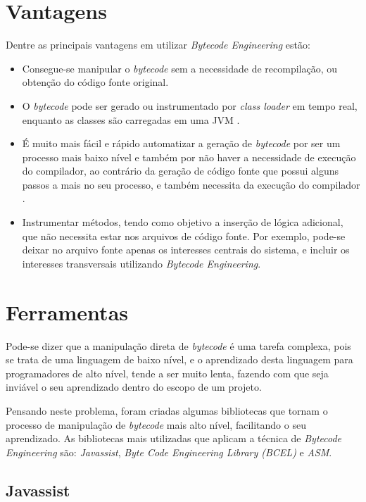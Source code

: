 \documentclass[tc,openright]{iiufrgs}
\begin{document}
\section {Vantagens}

Dentre as principais vantagens em utilizar \textit{Bytecode Engineering} estão:

\begin{itemize}
\item Consegue-se manipular o \textit{bytecode} sem a necessidade de recompilação, ou obtenção do código fonte original.
\item O \textit{bytecode} pode ser gerado ou instrumentado por \textit{class loader} em tempo real, enquanto as classes são carregadas em uma JVM \cite{kalinovsky2004covert}.
\item É muito mais fácil e rápido automatizar a geração de \textit{bytecode} por ser um processo mais baixo nível e também por não haver a necessidade de execução do compilador, ao contrário da geração de código fonte que possui alguns passos a mais no seu processo, e também necessita da execução do compilador \cite{kalinovsky2004covert}.
\item Instrumentar métodos, tendo como objetivo a inserção de lógica adicional, que não necessita estar nos arquivos de código fonte. Por exemplo, pode-se deixar no arquivo fonte apenas os interesses centrais do sistema, e incluir os interesses transversais utilizando \textit{Bytecode Engineering}. 
\end{itemize}

\section{Ferramentas}

Pode-se dizer que a manipulação direta de \textit{bytecode} é uma tarefa complexa, pois se trata de uma linguagem de baixo nível, e o aprendizado desta linguagem para programadores de alto nível, tende a ser muito lenta, fazendo com que seja inviável o seu aprendizado dentro do escopo de um projeto.

Pensando neste problema, foram criadas algumas bibliotecas que tornam o processo de manipulação de \textit{bytecode} mais alto nível, facilitando o seu aprendizado. As bibliotecas mais utilizadas que aplicam a técnica de \textit{Bytecode Engineering} são: \textit{Javassist}, \textit{Byte Code Engineering Library (BCEL)} e \textit{ASM}.

\subsection {Javassist}
\end{document}
